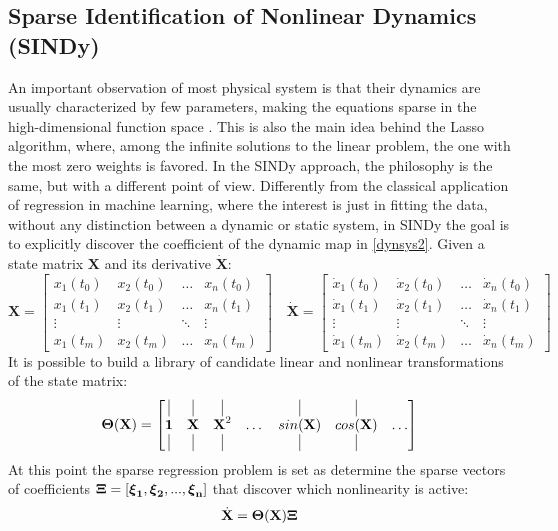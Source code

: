\documentclass[]{article}
\begin{document}
\subsection{Sparse Identification of  Nonlinear Dynamics (SINDy)}
An important observation of most physical system is that their dynamics are usually characterized by few parameters, making the equations sparse in the high-dimensional function space \cite{brunton2016}. This is also the main idea behind the Lasso algorithm, where, among the infinite solutions to the linear problem, the one with the most zero weights is favored. In the SINDy approach, the philosophy is the same, but with a different point of view. Differently from the classical application of regression in machine learning, where the interest is just in fitting the data, without any distinction between a dynamic or static system, in SINDy the goal is to explicitly discover the coefficient of the dynamic map in \eqref{dynsys2}. Given a state matrix $\textbf{X}$ and its derivative $\dot{\textbf{X}}$:
\begin{equation}
\textbf{X} = 
\begin{bmatrix}
	x_1(t_0) & x_2(t_0) & \dots &  x_n(t_0)\\
	x_1(t_1) & x_2(t_1) & \dots &  x_n(t_1)\\
	\vdots &  \vdots & \ddots &  \vdots \\
	x_1(t_m) & x_2(t_m) & \dots &  x_n(t_m) 
	\end{bmatrix} 
	\quad
	\dot{\textbf{X}} = 
	\begin{bmatrix}
	\dot x_1(t_0) & \dot x_2(t_0) & \dots &  \dot x_n(t_0)\\
	\dot x_1(t_1) & \dot x_2(t_1) & \dots &  \dot x_n(t_1)\\
	\vdots &  \vdots & \ddots &  \vdots \\
	\dot x_1(t_m) & \dot x_2(t_m) & \dots &  \dot x_n(t_m) 
\end{bmatrix}
\end{equation}
It is possible to build a  library of candidate linear and  nonlinear transformations of the state matrix:
\begin{equation}
\bf{\Theta}(\textbf{X}) = 
\begin{bmatrix}
\vline & \vline & \vline &  &  \vline & \vline & \\
\textbf{1} & \textbf{X} & \textbf{X}^2 & \dots & sin(\textbf{X}) & cos(\textbf{X}) & \dots \\
\vline & \vline & \vline &  & \vline & \vline & 
\end{bmatrix}
\end{equation}
At this point the sparse regression problem is set as determine the sparse vectors of coefficients $\bf\Xi = [\boldsymbol\xi_1, \boldsymbol\xi_2, ..., \boldsymbol\xi_n]$ that discover which nonlinearity is active:
\begin{equation}
\dot{\textbf X} = \bf \Theta(\textbf X) \bf{\Xi}
\end{equation}
\end{document}
